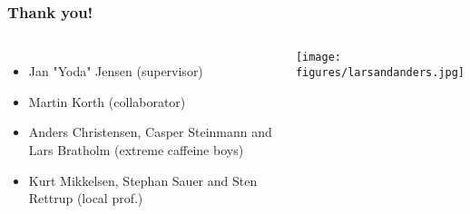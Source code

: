 \documentclass[12pt]{beamer}
\begin{document}
\begin{frame}
    \frametitle{Thank you!}

    \begin{columns}[c]



            \begin{itemize}

                \item Jan "Yoda" Jensen (supervisor)

                \item Martin Korth (collaborator)

                \item Anders Christensen, Casper Steinmann and Lars Bratholm
                    (extreme caffeine boys)

                \item Kurt Mikkelsen, Stephan Sauer and Sten Rettrup
                    (local prof.)

            \end{itemize}


            \texttt{[image: figures/larsandanders.jpg]}

    \end{columns}


\end{frame}




\end{document}
